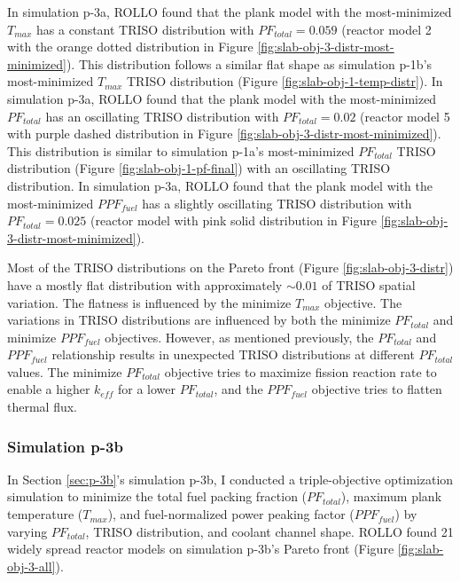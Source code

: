 In simulation p-3a, \gls{ROLLO} found that the plank model with the most-minimized 
$T_{max}$ has a constant TRISO distribution with $PF_{total} = 0.059$
(reactor model 2 with the orange dotted distribution in Figure 
\ref{fig:slab-obj-3-distr-most-minimized}). 
This distribution follows a similar flat shape as simulation p-1b's most-minimized 
$T_{max}$ TRISO distribution (Figure \ref{fig:slab-obj-1-temp-distr}).
In simulation p-3a, \gls{ROLLO} found that the plank model with the most-minimized 
$PF_{total}$ has an oscillating TRISO distribution with $PF_{total} = 0.02$
(reactor model 5 with purple dashed distribution in Figure 
\ref{fig:slab-obj-3-distr-most-minimized}). 
This distribution is similar to simulation p-1a's most-minimized $PF_{total}$ TRISO 
distribution (Figure \ref{fig:slab-obj-1-pf-final}) with an oscillating TRISO 
distribution.
In simulation p-3a, \gls{ROLLO} found that the plank model with the most-minimized 
$PPF_{fuel}$ has a slightly oscillating TRISO distribution with $PF_{total} = 0.025$ 
(reactor model with pink solid distribution in Figure 
\ref{fig:slab-obj-3-distr-most-minimized}). 

Most of the \gls{TRISO} distributions on the Pareto front (Figure 
\ref{fig:slab-obj-3-distr}) have a mostly flat distribution with approximately 
${\sim}0.01$ of TRISO spatial variation. 
The flatness is influenced by the minimize $T_{max}$ objective. 
The variations in \gls{TRISO} distributions are influenced by both the minimize 
$PF_{total}$ and minimize $PPF_{fuel}$ objectives. 
However, as mentioned previously, the $PF_{total}$ and $PPF_{fuel}$ relationship
results in unexpected TRISO distributions at different $PF_{total}$ values. 
The minimize $PF_{total}$ objective tries to maximize fission reaction rate
to enable a higher $k_{eff}$ for a lower $PF_{total}$, and 
the $PPF_{fuel}$ objective tries to flatten thermal flux. 

\subsubsection{Simulation p-3b}
In Section \ref{sec:p-3b}'s simulation p-3b, I conducted a triple-objective 
optimization simulation to minimize the total fuel packing fraction ($PF_{total}$), 
maximum plank temperature ($T_{max}$), and fuel-normalized power peaking factor 
($PPF_{fuel}$) by varying $PF_{total}$, TRISO distribution, and coolant channel shape.
\gls{ROLLO} found 21 widely spread reactor models on simulation p-3b's Pareto 
front (Figure \ref{fig:slab-obj-3-all}). 

